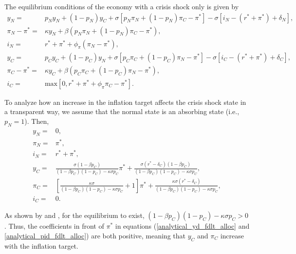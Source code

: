 \documentclass[11pt]{article}
\begin{document}
\begin{singlespace}
		The equilibrium conditions of the economy with a crisis shock only is given by
		\begin{align}
			y_{N} =& p_{N} y_{N} + (1-p_{N})y_C +  \sigma\left[p_{N} \pi_{N} + (1-p_{N})\pi_C - \pi^*\right] -\sigma\left[i_{N} - (r^* + \pi^*) + \delta_{N}\right] \label{ee_fdlt},\\
			\pi_{N} - \pi^*=& \kappa y_{N} + \beta\left(p_{N} \pi_{N} + (1-p_{N})\pi_C - \pi^*\right),\\
			i_{N} =& r^* + \pi^* + \phi_{\pi}(\pi_{N}-\pi^*),\\
			y_{C} =& p_C y_C + (1-p_C)y_{N} +  \sigma\left[p_C \pi_C + (1-p_C)\pi_{N} - \pi^*\right] - \sigma\left[i_C - (r^* + \pi^*)+ \delta_C\right],\\
			\pi_{C} - \pi^* =& \kappa y_C + \beta\left(p_C \pi_C + (1-p_C)\pi_{N} - \pi^*\right),\\
			i_C =&  \text{max}\left[0,r^* + \pi^*  + \phi_{\pi}\pi_C - \pi^*\right]. \label{i_fdlt}
		\end{align}



		To analyze how an increase in the inflation target affects the crisis shock state in a transparent way, we assume that the normal state is an absorbing state (i.e., $p_{N}=1$). Then,
		\begin{align}
			y_{N} =& 0,  \\
			\pi_{N} =& \pi^*, \\
			i_{N} =& r^* + \pi^*,  \\
			y_C =& \frac{\sigma(1-\beta p_C)}{(1-\beta p_C)(1-p_C) -\kappa\sigma p_C}\pi^{*} + \frac{\sigma ( r^*-\delta_C )(1-\beta p_C)}{(1-\beta p_C)(1-p_C) -\kappa\sigma p_C},  \label{analytical_yd_fdlt_alloc}\\
			\pi_C =& \left[\frac{\kappa\sigma}{(1-\beta p_C)(1-p_C) -\kappa\sigma p_C} + 1\right]\pi^*+\frac{\kappa\sigma(r^* - \delta_C)}{(1-\beta p_C)(1-p_C) -\kappa\sigma p_C},\label{analytical_pid_fdlt_alloc}\\
			i_C =& 0.
		\end{align}

		\noindent As shown by \citet{NakataSchmidtForthcomingJME} and \citet{NakataSchmidt2019}, for the equilibrium to exist, $(1-\beta p_C)(1-p_C) -\kappa\sigma p_C >0$. Thus, the coefficients in front of $\pi^*$ in equations (\ref{analytical_yd_fdlt_alloc} and \ref{analytical_pid_fdlt_alloc}) are both positive, meaning that $y_C$ and $\pi_C$ increase with the inflation target.


\end{singlespace}
\end{document}
